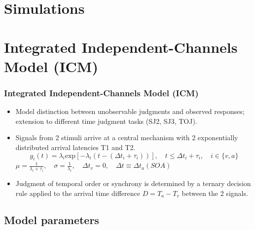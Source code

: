 \documentclass[xcolor={fixpdftex,hyperref,x11names},10pt,pdftex,hyperref={pdftex}]{beamer}
\begin{document}
\section{Simulations}
\label{sec:simu}




\section{Integrated Independent-Channels Model (ICM)}
\label{sec:icm}

\begin{frame}
  \frametitle{Integrated Independent-Channels Model (ICM)}
  \begin{itemize}
   \item  Model distinction between unobservable judgments and 
   observed responses; extension to different time judgment tasks (SJ2, SJ3, TOJ).  
   \item  Signals from 2 stimuli arrive at a central mechanism with 2
    exponentially distributed arrival latencies T1 and T2.
   \newline
  \begin{equation}
   g_i(t) = \lambda_i \text{exp}[-\lambda_i(t-(\Delta t_i + \tau_i ))],
   \quad t \leq \Delta t_i + \tau_i,\quad  i\in\{v,a\}        				                                                                                                                                                                                                                                                                                                                                                                
  \end{equation}
   \newline
   $\mu = \frac{1}{\lambda_i+\tau_i},\quad\sigma = \frac{1}{\lambda_i},
   \quad \Delta t_v=0, \quad\Delta t\equiv\Delta t_a (SOA) $
   \newline
   \item  Judgment of temporal order or synchrony is determined by 
   a ternary decision rule applied to the arrival time 
   difference $D=T_a-T_v$ between the 2 signals.
 \end{itemize}
\end{frame}

\subsection{Model parameters}
\end{document}
